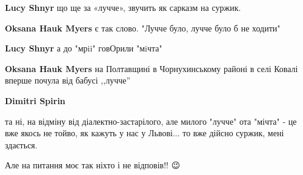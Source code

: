 \begin{itemize}
\begin{itemize}
 
\textbf{Lucy Shnyr} що ще за «лучче», звучить як сарказм на суржик.

 
\textbf{Oksana Hauk Myers} є так слово. "Лучче було, лучче було б не ходити"

 
\textbf{Lucy Shnyr} а до "мрii" говОрили "мiчта"🤣🤣🤣

 
\textbf{Oksana Hauk Myers} на Полтавщині в Чорнухинському районі в селі Ковалі вперше почула від бабусі ,,лучче''

 
\textbf{Dimitri Spirin} 

та ні, на відміну від діалектно-застарілого, але милого "лучче" ота "мічта" -
це вже якось не тойво, як кажуть у нас у Львові... то вже дійсно суржик, мені
здається.

Але на питання моє так ніхто і не відповів!! 😉


 

\end{itemize}
\end{itemize}
